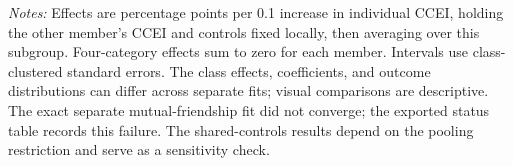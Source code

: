 \documentclass[11pt]{article}
\begin{document}
\footnotesize\textit{Notes:} Effects are percentage points per 0.1 increase in individual CCEI, holding the other member's CCEI and controls fixed locally, then averaging over this subgroup. Four-category effects sum to zero for each member. Intervals use class-clustered standard errors. The class effects, coefficients, and outcome distributions can differ across separate fits; visual comparisons are descriptive.
The exact separate mutual-friendship fit did not converge; the exported status table records this failure. The shared-controls results depend on the pooling restriction and serve as a sensitivity check.
\end{document}
